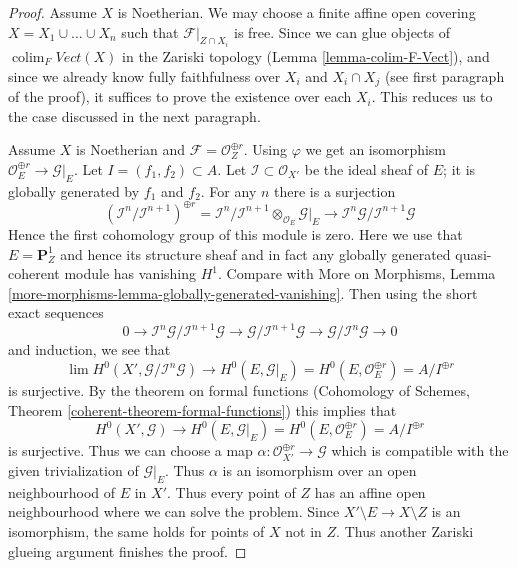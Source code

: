 \documentclass[10pt,a4paper]{amsart}
\theoremstyle{plain}
\theoremstyle{definition}
\theoremstyle{remark}
\numberwithin{equation}{subsection}
\def\lim{\mathop{\mathrm{lim}}\nolimits}
\def\colim{\mathop{\mathrm{colim}}\nolimits}
\begin{document}
\begin{proof}
\medskip\noindent
Assume $X$ is Noetherian. We may choose a finite affine open covering
$X = X_1 \cup \ldots \cup X_n$ such that $\mathcal{F}|_{Z \cap X_i}$ is free.
Since we can glue objects of $\colim_F \textit{Vect}(X)$
in the Zariski topology (Lemma \ref{lemma-colim-F-Vect}), and
since we already know
fully faithfulness over $X_i$ and $X_i \cap X_j$ (see first paragraph
of the proof), it suffices to prove the existence over each $X_i$.
This reduces us to the case discussed in the next paragraph.

\medskip\noindent
Assume $X$ is Noetherian and $\mathcal{F} = \mathcal{O}_Z^{\oplus r}$.
Using $\varphi$ we get an isomorphism
$\mathcal{O}_E^{\oplus r} \to \mathcal{G}|_E$.
Let $I = (f_1, f_2) \subset A$.
Let $\mathcal{I} \subset \mathcal{O}_{X'}$
be the ideal sheaf of $E$; it is globally generated by $f_1$ and $f_2$.
For any $n$ there is a surjection
$$
(\mathcal{I}^n/\mathcal{I}^{n + 1})^{\oplus r} =
\mathcal{I}^n/\mathcal{I}^{n + 1} \otimes_{\mathcal{O}_E}
\mathcal{G}|_E \longrightarrow
\mathcal{I}^n\mathcal{G}/\mathcal{I}^{n + 1}\mathcal{G}
$$
Hence the first cohomology group of this module is zero.
Here we use that $E = \mathbf{P}^1_Z$ and hence its structure
sheaf and in fact any globally generated quasi-coherent module
has vanishing $H^1$. Compare with More on Morphisms, Lemma
\ref{more-morphisms-lemma-globally-generated-vanishing}.
Then using the short exact sequences
$$
0 \to  \mathcal{I}^n\mathcal{G}/\mathcal{I}^{n + 1}\mathcal{G} \to
\mathcal{G}/\mathcal{I}^{n + 1}\mathcal{G} \to
\mathcal{G}/\mathcal{I}^n\mathcal{G} \to 0
$$
and induction, we see that
$$
\lim H^0(X', \mathcal{G}/\mathcal{I}^n\mathcal{G})
\to
H^0(E, \mathcal{G}|_E) = H^0(E, \mathcal{O}_E^{\oplus r}) =
A/I^{\oplus r}
$$
is surjective. By the theorem on formal functions
(Cohomology of Schemes, Theorem \ref{coherent-theorem-formal-functions})
this implies that
$$
H^0(X', \mathcal{G}) \to
H^0(E, \mathcal{G}|_E) = H^0(E, \mathcal{O}_E^{\oplus r}) =
A/I^{\oplus r}
$$
is surjective. Thus we can choose a map
$\alpha : \mathcal{O}_{X'}^{\oplus r} \to \mathcal{G}$
which is compatible with the given trivialization
of $\mathcal{G}|_E$. Thus $\alpha$ is an isomorphism over
an open neighbourhood of $E$ in $X'$. Thus every point
of $Z$ has an affine open neighbourhood where
we can solve the problem. Since $X' \setminus E \to X \setminus Z$
is an isomorphism, the same holds for points of $X$ not in $Z$.
Thus another Zariski glueing argument finishes the proof.
\end{proof}



\end{document}

